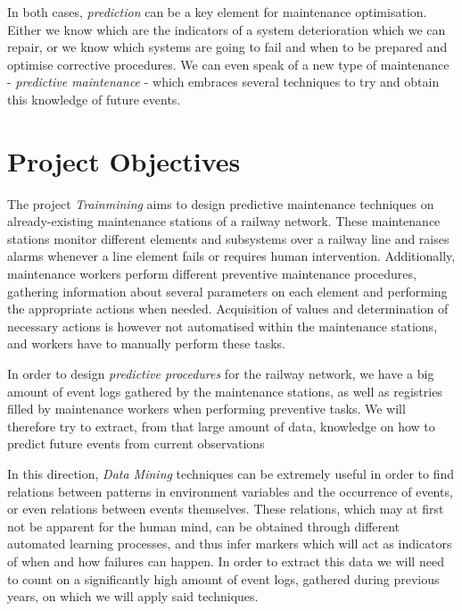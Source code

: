 In both cases, \emph{prediction} can be a key element for maintenance optimisation. Either we know which are the indicators of a system deterioration which we can repair, or we know which systems are going to fail and when to be prepared and optimise corrective procedures. We can even speak of a new type of maintenance - \emph{predictive maintenance} - which embraces several techniques to try and obtain this knowledge of future events.

\section{Project Objectives}
The project \emph{Trainmining} aims to design predictive maintenance techniques on already-existing maintenance stations of a railway network. These maintenance stations monitor different elements and subsystems over a railway line and raises alarms whenever a line element fails or requires human intervention. Additionally, maintenance workers perform different preventive maintenance procedures, gathering information about several parameters on each element and performing the appropriate actions when needed. Acquisition of values and determination of necessary actions is however not automatised within the maintenance stations, and workers have to manually perform these tasks.

In order to design \emph{predictive procedures} for the railway network, we have a big amount of event logs gathered by the maintenance stations, as well as registries filled by maintenance workers when performing preventive tasks. We will therefore try to extract, from that large amount of data, knowledge on how to predict future events from current observations

In this direction, \emph{Data Mining} techniques can be extremely useful in order to find relations between patterns in environment variables and the occurrence of events, or even relations between events themselves. These relations, which may at first not be apparent for the human mind, can be obtained through different automated learning processes, and thus infer markers which will act as indicators of when and how failures can happen. In order to extract this data we will need to count on a significantly high amount of event logs, gathered during previous years, on which we will apply said techniques.

